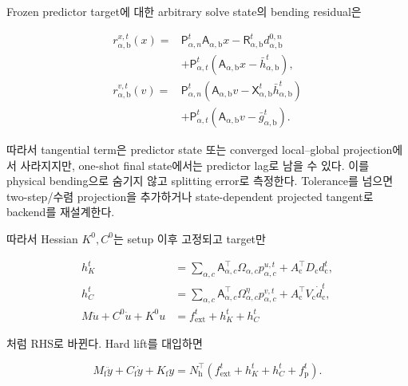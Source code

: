 \documentclass[11pt,a4paper]{article}
\begin{document}
Frozen predictor target에 대한 arbitrary solve state의 bending residual은

\begin{equation}
\begin{aligned}
  r_{\alpha,\mathrm b}^{x,t}(x)
  ={}&\mathsf P_{\alpha,n}^t\mathsf A_{\alpha,\mathrm b}x
  -\mathsf R_{\alpha,\mathrm b}^td_{\alpha,\mathrm b}^{0,n}\\
  &+\mathsf P_{\alpha,t}^t
  (\mathsf A_{\alpha,\mathrm b}x-\bar h_{\alpha,\mathrm b}^t),\\
  r_{\alpha,\mathrm b}^{v,t}(v)
  ={}&\mathsf P_{\alpha,n}^t
  (\mathsf A_{\alpha,\mathrm b}v
   -\mathsf X_{\alpha,\mathrm b}^t\bar h_{\alpha,\mathrm b}^t)\\
  &+\mathsf P_{\alpha,t}^t
  (\mathsf A_{\alpha,\mathrm b}v-\bar g_{\alpha,\mathrm b}^t).
  \label{eq:normal-curvature-one-shot-residual}
\end{aligned}
\end{equation}

따라서 tangential term은 predictor state 또는 converged local--global projection에서 사라지지만,
one-shot final state에서는 predictor lag로 남을 수 있다. 이를 physical bending으로 숨기지 않고
splitting error로 측정한다. Tolerance를 넘으면 two-step/수렴 projection을 추가하거나
state-dependent projected tangent로 backend를 재설계한다.

따라서 Hessian \(K^0,C^0\)는 setup 이후 고정되고 target만

\begin{equation}
\begin{aligned}
  h_K^t&=\sum_{\alpha,c}\mathsf A_{\alpha,c}^\top
  \Omega_{\alpha,c}p_{\alpha,c}^{u,t}
  +A_{\mathrm c}^\top D_{\mathrm c}d_{\mathrm c}^t,\\
  h_C^t&=\sum_{\alpha,c}\mathsf A_{\alpha,c}^\top
  \Omega_{\alpha,c}^{\eta}p_{\alpha,c}^{v,t}
  +A_{\mathrm c}^\top V_{\mathrm c}\dot d_{\mathrm c}^t,\\
  M\ddot u+C^0\dot u+K^0u&=f_{\mathrm{ext}}^t+h_K^t+h_C^t
  \label{eq:canonical-structural-force-ledger}
\end{aligned}
\end{equation}

처럼 RHS로 바뀐다. Hard lift를 대입하면

\begin{equation}
  M_{\mathrm f}\ddot y+C_{\mathrm f}\dot y+K_{\mathrm f}y
  =N_{\mathrm h}^\top
  (f_{\mathrm{ext}}^t+h_K^t+h_C^t+f_{\mathrm p}^t).
  \label{eq:free-structural-force-ledger}
\end{equation}
\end{document}
